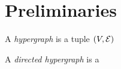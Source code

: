 \documentclass[the-pdg-manual.tex]{subfiles}
\begin{document}
\section{Preliminaries}

\begin{defn}
    A \emph{hypergraph} is a tuple $(V, \mathcal E)$
\end{defn}

\begin{defn}
    A \emph{directed hypergraph} is a 
\end{defn}
\end{document}
